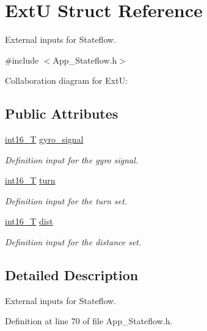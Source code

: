 \hypertarget{struct_ext_u}{}\section{ExtU Struct Reference}
\label{struct_ext_u}


External inputs for Stateflow.  




{\ttfamily \#include $<$App\+\_\+\+Stateflow.\+h$>$}



Collaboration diagram for ExtU\+:
\subsection*{Public Attributes}
\begin{DoxyCompactItemize}
\item 
\mbox{\hyperlink{_app___stateflowtypes_8h_ad73c6af88bb2ce70799e51f639309f21}{int16\+\_\+T}} \mbox{\hyperlink{struct_ext_u_a6c0a282afef47d6b37f84bc45769e69d}{gyro\+\_\+signal}}
\begin{DoxyCompactList}\small\item\em Definition input for the gyro signal. \end{DoxyCompactList}\item 
\mbox{\hyperlink{_app___stateflowtypes_8h_ad73c6af88bb2ce70799e51f639309f21}{int16\+\_\+T}} \mbox{\hyperlink{struct_ext_u_a70e9fe496991f7c0e1fe8f54c5bf4c97}{turn}}
\begin{DoxyCompactList}\small\item\em Definition input for the turn set. \end{DoxyCompactList}\item 
\mbox{\hyperlink{_app___stateflowtypes_8h_ad73c6af88bb2ce70799e51f639309f21}{int16\+\_\+T}} \mbox{\hyperlink{struct_ext_u_a6c69fa6ebe22e9a073888b6b9dce877d}{dist}}
\begin{DoxyCompactList}\small\item\em Definition input for the distance set. \end{DoxyCompactList}\end{DoxyCompactItemize}


\subsection{Detailed Description}
External inputs for Stateflow. 

Definition at line 70 of file App\+\_\+\+Stateflow.\+h.



